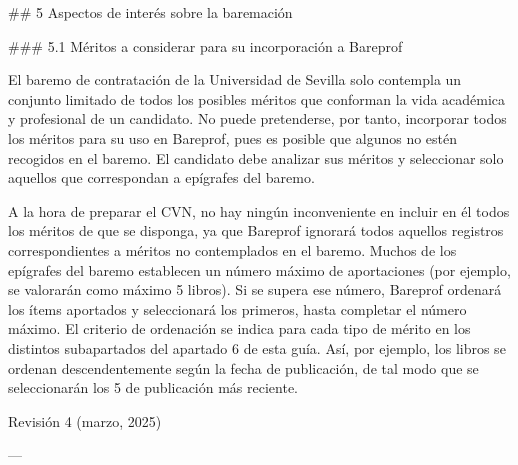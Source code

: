 \documentclass{article}
\begin{document}
\begin{itemize}
\begin{itemize}
\begin{scriptsize}
                  \#\# 5 Aspectos de interés sobre la baremación

                  \#\#\# 5.1 Méritos a considerar para su incorporación a Bareprof

                  El baremo de contratación de la Universidad de Sevilla solo contempla un conjunto limitado de todos los posibles méritos que conforman la vida académica y profesional de un candidato. No puede pretenderse, por tanto, incorporar todos los méritos para su uso en Bareprof, pues es posible que algunos no estén recogidos en el baremo. El candidato debe analizar sus méritos y seleccionar solo aquellos que correspondan a epígrafes del baremo.

                  A la hora de preparar el CVN, no hay ningún inconveniente en incluir en él todos los méritos de que se disponga, ya que Bareprof ignorará todos aquellos registros correspondientes a méritos no contemplados en el baremo. Muchos de los epígrafes del baremo establecen un número máximo de aportaciones (por ejemplo, se valorarán como máximo 5 libros). Si se supera ese número, Bareprof ordenará los ítems aportados y seleccionará los primeros, hasta completar el número máximo. El criterio de ordenación se indica para cada tipo de mérito en los distintos subapartados del apartado 6 de esta guía. Así, por ejemplo, los libros se ordenan descendentemente según la fecha de publicación, de tal modo que se seleccionarán los 5 de publicación más reciente.

                  Revisión 4 (marzo, 2025)

                  ---


\end{scriptsize}
\end{itemize}
\end{itemize}
\end{document}

